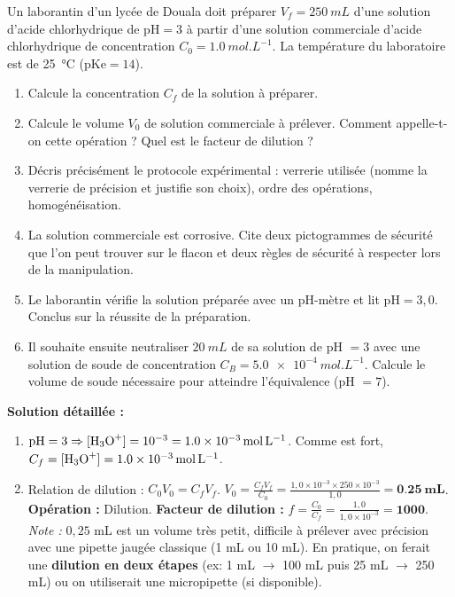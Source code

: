 \documentclass[11pt]{article}
\begin{document}
\begin{exoresolu}
Un laborantin d'un lycée de Douala doit préparer $V_f = \SI{250}{mL}$ d'une solution d'acide chlorhydrique de $\mathrm{pH} = 3$ à partir d'une solution commerciale d'acide chlorhydrique de concentration $C_0 = \SI{1,0}{mol.L^{-1}}$. La température du laboratoire est de \SI{25}{\celsius} ($\mathrm{pKe} = 14$).
\begin{enumerate}
\item Calcule la concentration $C_f$ de la solution à préparer.
\item Calcule le volume $V_0$ de solution commerciale à prélever. Comment appelle-t-on cette opération ? Quel est le facteur de dilution ?
\item Décris précisément le protocole expérimental : verrerie utilisée (nomme la verrerie de précision et justifie son choix), ordre des opérations, homogénéisation.
\item La solution commerciale est corrosive. Cite deux pictogrammes de sécurité que l'on peut trouver sur le flacon et deux règles de sécurité à respecter lors de la manipulation.
\item Le laborantin vérifie la solution préparée avec un pH-mètre et lit $\mathrm{pH} = 3{,}0$. Conclus sur la réussite de la préparation.
\item Il souhaite ensuite neutraliser $\SI{20}{mL}$ de sa solution de pH $= 3$ avec une solution de soude de concentration $C_B = \SI{5,0e-4}{mol.L^{-1}}$. Calcule le volume de soude nécessaire pour atteindre l'équivalence (pH $= 7$).
\end{enumerate}
\tcblower
\textbf{Solution détaillée :}
\begin{enumerate}
\item $\mathrm{pH} = 3 \Rightarrow [\ce{H3O+}] = 10^{-3} = \SI{1,0e-3}{mol.L^{-1}}$.
Comme  est fort, $C_f = [\ce{H3O+}] = \mathbf{\SI{1,0e-3}{mol.L^{-1}}}$.
\item Relation de dilution : $C_0 V_0 = C_f V_f$.
$V_0 = \frac{C_f V_f}{C_0} = \frac{1,0 \times 10^{-3} \times 250 \times 10^{-3}}{1,0} = \mathbf{\SI{0,25}{mL}}$.
\textbf{Opération :} Dilution. \textbf{Facteur de dilution :} $f = \frac{C_0}{C_f} = \frac{1,0}{1,0 \times 10^{-3}} = \mathbf{1000}$.
\textit{Note :} $0,25$ mL est un volume très petit, difficile à prélever avec précision avec une pipette jaugée classique (1 mL ou 10 mL). En pratique, on ferait une \textbf{dilution en deux étapes} (ex: 1 mL $\to$ 100 mL puis 25 mL $\to$ 250 mL) ou on utiliserait une micropipette (si disponible).

\end{enumerate}
\end{exoresolu}
\end{document}
